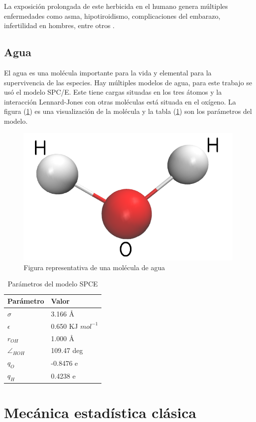 La exposición prolongada de este herbicida en el humano genera múltiples enfermedades como asma, hipotiroidismo, complicaciones del embarazo, infertilidad en hombres, entre otros \cite{24dpubchem}.

\section{Agua}

El agua es una molécula importante para la vida y elemental para la supervivencia de las especies. Hay múltiples modelos de agua, para este trabajo se usó el modelo SPC/E. Este tiene cargas situadas en los tres átomos y la interacción Lennard-Jones con otras moléculas está situada en el oxígeno. La figura (\ref{fig:SPCE}) es una visualización de la molécula y la tabla (\ref{SPCEpar}) son los parámetros del modelo.

\begin{figure}[!h]
    \centering
    \includegraphics[width=.3\textwidth,keepaspectratio=true]{SPCE.png}
    \caption{Figura representativa de una molécula de agua}
    \label{fig:SPCE}
\end{figure}

\begin{table}[h!]
    \centering

    \begin{tabular}{ |p{2cm}|p{3cm}|  }
    \hline
    Parámetro  & Valor \\
    \hline
    $\sigma$  & 3.166 \AA \\
    $\epsilon$& 0.650 KJ $mol^{-1}$ \\
    $r_{OH}$  & 1.000 \AA \\
    $\angle_{HOH}$&109.47 deg \\
    $q_{O}$   & -0.8476 e \\
    $q_{H}$   & 0.4238 e \\
    \hline
    \end{tabular}
    \caption{Parámetros del modelo SPCE}
    \label{SPCEpar}
\end{table}


\chapter{Mecánica estadística clásica}\label{chap:mecanica_estadistica}

